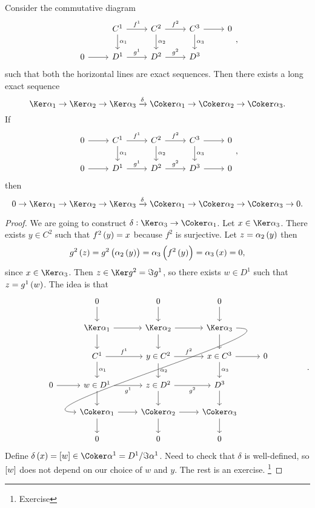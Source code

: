 \begin{lemma}
Consider the commutative diagram
$$
\begin{tikzcd}
& C^1 \arrow{r}{f^1} \arrow{d}{\alpha_1} & C^2 \arrow{r}{f^2} \arrow{d}{\alpha_2} & C^3 \arrow{r} \arrow{d}{\alpha_3} & 0 \\
0 \arrow{r} & D^1 \arrow{r}{g^1} & D^2 \arrow{r}{g^2} & D^3 &
\end{tikzcd},
$$
such that both the horizontal lines are exact sequences. Then there exists a long exact sequence
$$ \Ker \alpha_1 \to \Ker \alpha_2 \to \Ker \alpha_3 \xrightarrow{\delta} \Coker \alpha_1 \to \Coker \alpha_2 \to \Coker \alpha_3. $$
If
$$
\begin{tikzcd}
0 \arrow{r} & C^1 \arrow{r}{f^1} \arrow{d}{\alpha_1} & C^2 \arrow{r}{f^2} \arrow{d}{\alpha_2} & C^3 \arrow{r} \arrow{d}{\alpha_3} & 0 \\
0 \arrow{r} & D^1 \arrow{r}{g^1} & D^2 \arrow{r}{g^2} & D^3 \arrow{r} & 0
\end{tikzcd},
$$
then
$$ 0 \to \Ker \alpha_1 \to \Ker \alpha_2 \to \Ker \alpha_3 \xrightarrow{\delta} \Coker \alpha_1 \to \Coker \alpha_2 \to \Coker \alpha_3 \to 0. $$
\end{lemma}

\begin{proof}
We are going to construct $ \delta : \Ker \alpha_3 \to \Coker \alpha_1 $. Let $ x \in \Ker \alpha_3 $. There exists $ y \in C^2 $ such that $ f^2\br{y} = x $ because $ f^2 $ is surjective. Let $ z = \alpha_2\br{y} $ then
$$ g^2\br{z} = g^2\br{\alpha_2\br{y}} = \alpha_3\br{f^2\br{y}} = \alpha_3\br{x} = 0, $$
since $ x \in \Ker \alpha_3 $. Then $ z \in \Ker g^2 = \Im g^1 $, so there exists $ w \in D^1 $ such that $ z = g^1\br{w} $. The idea is that
$$
\begin{tikzcd}
& 0 \arrow{d} & 0 \arrow{d} & 0 \arrow{d} & \\
& \Ker \alpha_1 \arrow{r} \arrow{d} & \Ker \alpha_2 \arrow{r} \arrow{d} & \Ker \alpha_3 \arrow{d} \arrow[in=180, out=0]{dddll} & \\
& C^1 \arrow{r}{f^1} \arrow{d}{\alpha_1} & y \in C^2 \arrow{r}{f^2} \arrow{d}{\alpha_2} & x \in C^3 \arrow{r} \arrow{d}{\alpha_3} & 0 \\
0 \arrow{r} & w \in D^1 \arrow[swap]{r}{g^1} \arrow{d} & z \in D^2 \arrow[swap]{r}{g^2} \arrow{d} & D^3 \arrow{d} &\\
& \Coker \alpha_1 \arrow{r} \arrow{d} & \Coker \alpha_2 \arrow{r} \arrow{d} & \Coker \alpha_3 \arrow{d} & \\
& 0 & 0 & 0 &
\end{tikzcd}.
$$
Define $ \delta\br{x} = \sbr{w} \in \Coker \alpha^1 = D^1 / \Im \alpha^1 $. Need to check that $ \delta $ is well-defined, so $ \sbr{w} $ does not depend on our choice of $ w $ and $ y $. The rest is an exercise. \footnote{Exercise}
\end{proof}


